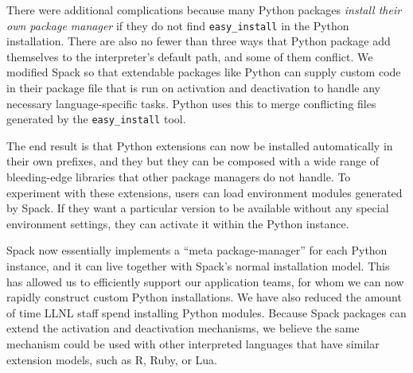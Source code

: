 There were additional complications because many Python packages {\it install their own
package manager} if they do not find {\tt easy\_install} in the Python installation.
There are also no fewer than three ways that Python package add themselves to the
interpreter's default path, and some of them conflict. We modified Spack so that 
extendable packages like Python can supply custom code in their package file that is
run on activation and deactivation to handle any necessary language-specific tasks.
Python uses this to merge conflicting files generated by the {\tt easy\_install} tool.

The end result is that Python extensions can now be installed automatically
in their own prefixes, and they but they can be composed with a wide range
of bleeding-edge libraries that other package managers do not handle.  To experiment
with these extensions, users can load environment modules generated by Spack.
If they want a particular version to be available without any special environment 
settings, they can activate it within the Python instance.

Spack now essentially implements a ``meta package-manager'' for each Python
instance, and it can live together with Spack's normal installation model.
This has allowed us to efficiently support our application teams, for whom we can
now rapidly construct custom Python installations.  We have also reduced
the amount of time LLNL staff spend installing Python modules.
Because Spack packages can extend the activation and deactivation mechanisms,
we believe the same mechanism could be used with other 
interpreted languages that have similar extension models, such as R, Ruby, or Lua.

